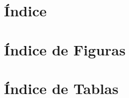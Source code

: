 \chapter*{Índice}

\TableOfContentsNoTitle

\chapter*{Índice de Figuras}

\ListOfFiguresNoTitle

\chapter*{Índice de Tablas}

\ListOfTablesNoTitle

